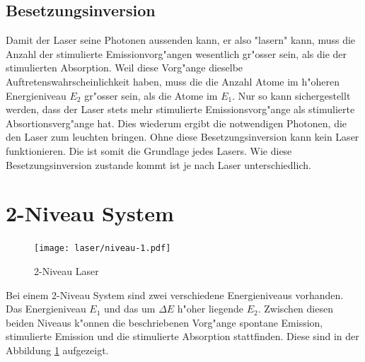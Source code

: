 \begin{refsection}
\subsection{Besetzungsinversion}
\label{Besetzungsinversion}
Damit der Laser seine Photonen aussenden kann, er also "lasern" kann,
muss die Anzahl der stimulierte Emissionvorg"angen wesentlich gr"osser sein,
als die der stimulierten Absorption.
Weil diese Vorg"ange dieselbe Auftretenswahrscheinlichkeit haben,
muss die die Anzahl Atome im h"oheren Energieniveau $E_2$ gr"osser sein,
als die Atome im $E_1$.
Nur so kann sichergestellt werden, dass der Laser stets mehr stimulierte
Emissionsvorg"ange als stimulierte Absortionsverg"ange hat. 
Dies wiederum ergibt die notwendigen Photonen, die den Laser zum leuchten
bringen.
Ohne diese Besetzungsinversion kann kein Laser funktionieren. 
Die ist somit die Grundlage jedes Lasers. 
Wie diese Besetzungsinversion zustande kommt ist je nach Laser
unterschiedlich.


\section{2-Niveau System}
\label{2-Niveau System}
\begin{figure}
\centering
\texttt{[image: laser/niveau-1.pdf]}
\caption{2-Niveau Laser}
\label{2-Niveau Laser Meta}
\end{figure}
Bei einem 2-Niveau System sind zwei verschiedene Energieniveaus vorhanden.
Das Energieniveau $E_1$ und das um $\Delta E$ h"oher liegende $E_2$.
Zwischen diesen beiden Niveaus k"onnen die beschriebenen Vorg"ange spontane
Emission, stimulierte Emission und die stimulierte Absorption stattfinden.
Diese sind in der Abbildung \ref{2-Niveau Laser Meta} aufgezeigt.


\end{refsection}
